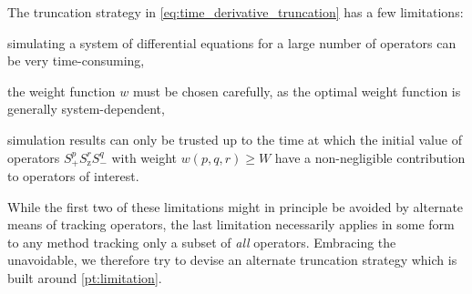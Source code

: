 \documentclass[aps,notitlepage,nofootinbib,11pt]{revtex4-1}
\newcommand{\p}[1]{\left(#1\right)} %
\newcommand{\z}{\text{z}}
\newcommand{\1}{\mathds{1}}
\begin{document}
The truncation strategy in \eqref{eq:time_derivative_truncation} has a
few limitations:
\begin{enumerate*}[label=(\roman*)]
\item simulating a system of differential equations for a large number
  of operators can be very time-consuming,
\item the weight function $w$ must be chosen carefully, as the optimal
  weight function is generally system-dependent,
\item simulation results can only be trusted up to the time at which
  the initial value of operators $S_+^p S_\z^r S_-^q$ with weight
  $w\p{p,q,r}\ge W$ have a non-negligible contribution to operators of
  interest.
  \label{pt:limitation}
\end{enumerate*}
While the first two of these limitations might in principle be avoided
by alternate means of tracking operators, the last limitation
necessarily applies in some form to any method tracking only a subset
of {\it all} operators.  Embracing the unavoidable, we therefore try
to devise an alternate truncation strategy which is built around
\ref{pt:limitation}.
\end{document}
